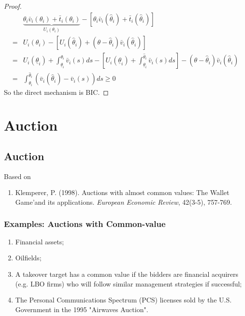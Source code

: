 \documentclass[11pt]{elegantbook_2}
\begin{document}
\begin{proof}
    \begin{equation}
        \begin{aligned}
            &\underbrace{\theta_i \bar{v}_i(\theta_i)+\bar{t}_i(\theta_i)}_{U_i(\theta_i)}-\left[\theta_i \bar{v}_i(\hat{\theta}_i)+\bar{t}_i(\hat{\theta}_i)\right]\\
            =&U_i(\theta_i)-\left[U_i(\hat{\theta}_i)+(\theta-\hat{\theta}_i)\bar{v}_i(\hat{\theta}_i)\right]\\
            =&U_i(\underline{\theta}_i)+\int_{\underline{\theta}_i}^{\theta_i}\bar{v}_i(s)ds-[U_i(\underline{\theta}_i)+\int_{\underline{\theta}_i}^{\hat{\theta}_i}\bar{v}_i(s)ds]-(\theta-\hat{\theta}_i)\bar{v}_i(\hat{\theta}_i)\\
            =&\int_{\theta_i}^{\hat{\theta}_i}(\bar{v}_i(\hat{\theta}_i)-\bar{v}_i(s))ds\geq 0
        \end{aligned}
        \nonumber
    \end{equation}
    So the direct mechanism is BIC.
\end{proof}


\chapter{Auction}
\section{Auction}
Based on
\begin{enumerate}[$\circ$]
    \item Klemperer, P. (1998). Auctions with almost common values: The Wallet Game'and its applications. \textit{European Economic Review}, 42(3-5), 757-769.
\end{enumerate}


\subsection{Examples: Auctions with Common-value}
\begin{enumerate}[(1).]
    \item Financial assets;
    \item Oilfields;
    \item A takeover target has a common value if the bidders are financial acquirers (e.g. LBO firms) who will follow similar management strategies if successful;
    \item The Personal Communications Spectrum (PCS) licenses sold by the U.S. Government in the 1995 "Airwaves Auction".
\end{enumerate}
\end{document}
